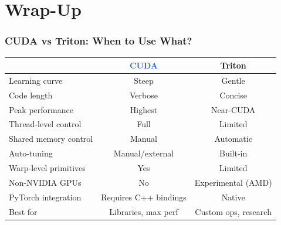 \documentclass[aspectratio=169]{beamer}
\begin{document}
\section{Wrap-Up}

\begin{frame}
	\frametitle{CUDA vs Triton: When to Use What?}
	\renewcommand{\arraystretch}{1.3}
	\begin{center}
		\begin{tabular}{l c c}
			\toprule
			                          & \textcolor{highlight}{CUDA}  & \textcolor{codegreen}{Triton} \\
			\midrule
			Learning curve            & Steep                        & Gentle                        \\
			Code length               & Verbose                      & Concise                       \\
			Peak performance          & Highest                      & Near-CUDA                     \\
			Thread-level control      & Full                         & Limited                       \\
			Shared memory control     & Manual                       & Automatic                     \\
			Auto-tuning               & Manual/external              & Built-in                      \\
			Warp-level primitives     & Yes                          & Limited                       \\
			Non-NVIDIA GPUs           & No                           & Experimental (AMD)            \\
			PyTorch integration       & Requires C++ bindings        & Native                        \\
			Best for                  & Libraries, max perf          & Custom ops, research          \\
			\bottomrule
		\end{tabular}
	\end{center}
\end{frame}
\end{document}

